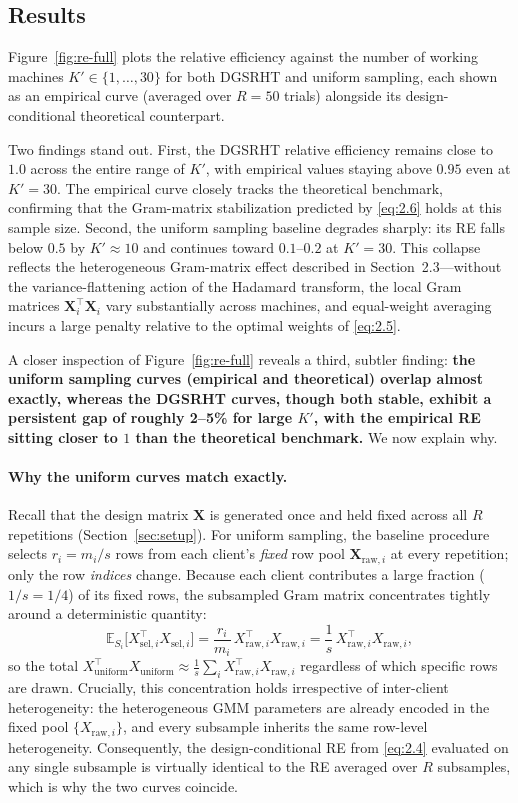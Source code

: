 \documentclass[11pt]{article}
\numberwithin{equation}{section}
\theoremstyle{plain}
\theoremstyle{definition}
\theoremstyle{remark}
\begin{document}
\subsection{Results}

Figure~\ref{fig:re-full} plots the relative efficiency against the number of working machines $K'\in\{1,\ldots,30\}$ for both DGSRHT and uniform sampling, each shown as an empirical curve (averaged over $R=50$ trials) alongside its design-conditional theoretical counterpart.

Two findings stand out. First, the DGSRHT relative efficiency remains close to $1.0$ across the entire range of $K'$, with empirical values staying above $0.95$ even at $K'=30$. The empirical curve closely tracks the theoretical benchmark, confirming that the Gram-matrix stabilization predicted by \eqref{eq:2.6} holds at this sample size. Second, the uniform sampling baseline degrades sharply: its RE falls below $0.5$ by $K'\approx 10$ and continues toward $0.1$--$0.2$ at $K'=30$. This collapse reflects the heterogeneous Gram-matrix effect described in Section~2.3---without the variance-flattening action of the Hadamard transform, the local Gram matrices $\mathbf{X}_i^\top\mathbf{X}_i$ vary substantially across machines, and equal-weight averaging incurs a large penalty relative to the optimal weights of \eqref{eq:2.5}.

A closer inspection of Figure~\ref{fig:re-full} reveals a third, subtler finding: \textbf{the uniform sampling curves (empirical and theoretical) overlap almost exactly, whereas the DGSRHT curves, though both stable, exhibit a persistent gap of roughly 2--5\% for large $K'$, with the empirical RE sitting closer to $1$ than the theoretical benchmark.} We now explain why.

\paragraph{Why the uniform curves match exactly.}
Recall that the design matrix $\mathbf{X}$ is generated once and held fixed across all $R$ repetitions (Section~\ref{sec:setup}).
For uniform sampling, the baseline procedure selects $r_i = m_i/s$ rows from each client's \emph{fixed} row pool $\mathbf{X}_{\mathrm{raw},i}$ at every repetition; only the row \emph{indices} change.
Because each client contributes a large fraction ($1/s = 1/4$) of its fixed rows, the subsampled Gram matrix concentrates tightly around a deterministic quantity:
\[
  \mathbb{E}_{S_i}\bigl[X_{\mathrm{sel},i}^{\top}X_{\mathrm{sel},i}\bigr]
  = \frac{r_i}{m_i}\,X_{\mathrm{raw},i}^{\top}X_{\mathrm{raw},i}
  = \frac{1}{s}\,X_{\mathrm{raw},i}^{\top}X_{\mathrm{raw},i},
\]
so the total $X_{\mathrm{uniform}}^{\top}X_{\mathrm{uniform}} \approx \frac{1}{s}\sum_{i} X_{\mathrm{raw},i}^{\top}X_{\mathrm{raw},i}$ regardless of which specific rows are drawn.
Crucially, this concentration holds irrespective of inter-client heterogeneity: the heterogeneous GMM parameters are already encoded in the fixed pool $\{X_{\mathrm{raw},i}\}$, and every subsample inherits the same row-level heterogeneity.
Consequently, the design-conditional RE from \eqref{eq:2.4} evaluated on any single subsample is virtually identical to the RE averaged over $R$ subsamples, which is why the two curves coincide.
\end{document}
